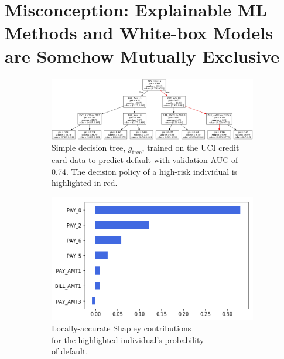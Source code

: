 \documentclass[fleqn]{article}
\begin{document}
\section{Misconception: Explainable ML Methods and White-box Models are Somehow Mutually Exclusive} \label{sec:white_box}

\begin{figure}[ht!]
	\begin{subfigure}{.6\textwidth}
		\includegraphics[height=.45\linewidth, width=1.15\linewidth]{img/dt.png}
  		\caption{Simple decision tree, $g_{\text{tree}}$, trained on the UCI credit card data to predict default with validation AUC of 0.74. The decision policy of a high-risk individual is highlighted in red.}
  		\label{fig:dt}
	\end{subfigure}\hspace{50pt}
	\begin{subfigure}{.4\textwidth}
		\vspace{30pt}
  		\includegraphics[height=.5\linewidth, width=.8\linewidth]{img/shap.png}
  		\vspace{5pt}
  		\caption{Locally-accurate Shapley contributions\\ for the highlighted individual's probability\\ of default.}
  		\label{fig:shap}
	\end{subfigure}
	\caption{}
	\label{fig:dt_shap}
\end{figure}
\end{document}
